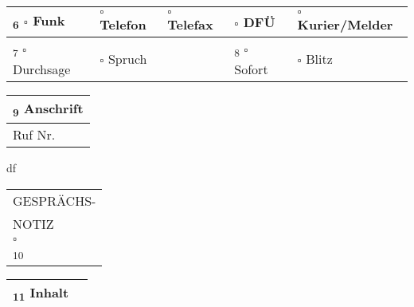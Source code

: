 \documentclass[a5paper,6pt]{article}
\def \uncheckedbox{$\square$ }
\begin{document}
\begin{minipage}{\textwidth}
\begin{tabularx}{0.9913\textwidth}{|X X X X X|}
\textsubscript{6} \uncheckedbox Funk & \uncheckedbox Telefon & \uncheckedbox Telefax &  \hspace{9.8pt}\uncheckedbox DFÜ &  \uncheckedbox Kurier/Melder\\
\hline
\textsubscript{7} \uncheckedbox Durchsage & \uncheckedbox Spruch &   & \textsubscript{ 8} \uncheckedbox Sofort &  \uncheckedbox Blitz\\
\hline
\end{tabularx}
\vspace{-1.2pt}
\end{minipage}
\begin{minipage}{\textwidth}
\begin{minipage}{0.2\textwidth}
\renewcommand{\arraystretch}{2}
\begin{tabularx}{\textwidth}{|X|}
\textsubscript{9} Anschrift\\
\hline
\hspace{7.8pt}Ruf Nr.
\end{tabularx}
\end{minipage}
\begin{minipage}{0.5755\textwidth}
df
\end{minipage}
\begin{minipage}{0.2\textwidth}
\begin{tabularx}{\textwidth}{|X|}
\centering	GESPRÄCHS- \tabularnewline
\centering	NOTIZ \tabularnewline
\hline
\centering \uncheckedbox \tabularnewline
\textsubscript{10}
\end{tabularx}
\end{minipage}
\vspace{-1.5pt}
\end{minipage}
\begin{minipage}{\textwidth}
\begin{tabularx}{0.9913\textwidth}{|p{72.7pt}|X|}
\hline
\textsubscript{11} Inhalt & \\
\hline
\end{tabularx}
\vspace{-1.5pt}
\end{minipage}
\begin{minipage}{\textwidth}
	\begin{tabularx}{0.9913\textwidth}{|X|}
		\lipsum[1-2]\\
		\hline
	\end{tabularx}
\vspace{-1pt}
\end{minipage}
\end{document}
